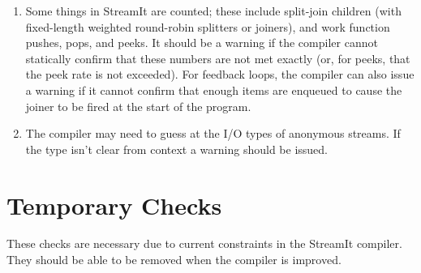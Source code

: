 \documentclass[11pt]{article}
\begin{document}
\begin{enumerate}
\item Some things in StreamIt are counted; these include split-join
  children (with fixed-length weighted round-robin splitters or
  joiners), and work function pushes, pops, and peeks.  It should be a
  warning if the compiler cannot statically confirm that these numbers
  are not met exactly (or, for peeks, that the peek rate is not
  exceeded).   For feedback loops, the compiler can also issue a
  warning if it cannot confirm that enough items are enqueued to cause
  the joiner to be fired at the start of the program.
\item The compiler may need to guess at the I/O types of anonymous
  streams.  If the type isn't clear from context a warning should be
  issued.
\end{enumerate}

\section{Temporary Checks}

These checks are necessary due to current constraints in the StreamIt
compiler.  They should be able to be removed when the compiler is
improved.
\end{document}
